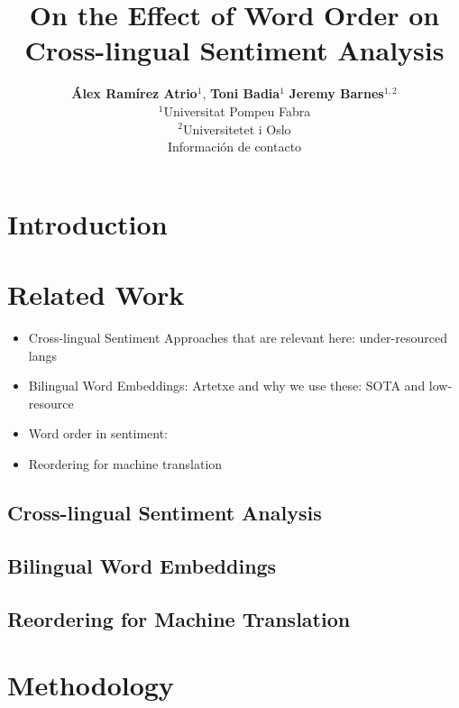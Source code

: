 \documentclass[a4paper,11pt,twocolumn,twoside]{article}
\title{On the Effect of Word Order on Cross-lingual Sentiment Analysis}
\author {\textbf{Álex Ramírez Atrio$^1$}, \textbf{Toni Badia$^{1}$} \textbf{Jeremy Barnes$^{1,2}$}\\
$^1$Universitat Pompeu Fabra\\
$^2$Universitetet i Oslo\\
Información de contacto\\
}
\begin{document}



\label{firstpage} \maketitle

%

\section{Introduction}


\section{Related Work}

\begin{itemize}

\item Cross-lingual Sentiment Approaches that are relevant here: under-resourced langs
\item Bilingual Word Embeddings: Artetxe and why we use these: SOTA and low-resource
\item Word order in sentiment:
\item Reordering for machine translation
\end{itemize}

\subsection{Cross-lingual Sentiment Analysis}

\subsection{Bilingual Word Embeddings}

\subsection{Reordering for Machine Translation}

\section{Methodology}
\end{document}
